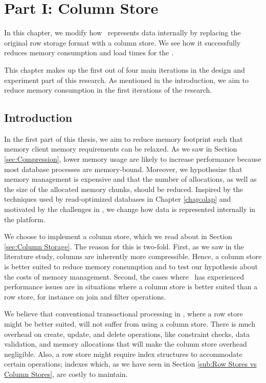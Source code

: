 \chapter{Part I: Column Store}
\label{chap:column-store}

In this chapter, we modify how \gap~represents data internally by replacing the original row storage format with a column store. We see how it successfully reduces memory consumption and load times for the \tpch.

This chapter makes up the first out of four main iterations in the design and experiment part of this research. As mentioned in the introduction, we aim to reduce memory consumption in the first iterations of the research.

\clearpage

\section{Introduction}
\label{sec:Introduction}
In the first part of this thesis, we aim to reduce memory footprint such that memory client memory requirements can be relaxed. As we saw in Section \ref{sec:Compression}, lower memory usage are likely to increase performance because most database processes are memory-bound. Moreover, we hypothesize that memory management is expensive and that the number of allocations, as well as the size of the allocated memory chunks, should be reduced. Inspired by the techniques used by read-optimized databases in Chapter \ref{chap:olap} and motivated by the challenges in \gap, we change how data is represented internally in the platform.

We choose to implement a column store, which we read about in Section \ref{sec:Column Storage}. The reason for this is two-fold. First, as we saw in the literature study, columns are inherently more compressible. Hence, a column store is better suited to reduce memory consumption and to test our hypothesis about the costs of memory management. Second, the cases where \genus~has experienced performance issues are in situations where a column store is better suited than a row store, for instance on join and filter operations.

We believe that conventional transactional processing in \gap, where a row store might be better suited, will not suffer from using a column store. There is much overhead on create, update, and delete operations, like constraint checks, data validation, and memory allocations that will make the column store overhead negligible. Also, a row store might require index structures to accommodate certain operations; indexes which, as we have seen in Section \ref{sub:Row Stores vs Column Stores}, are costly to maintain.

